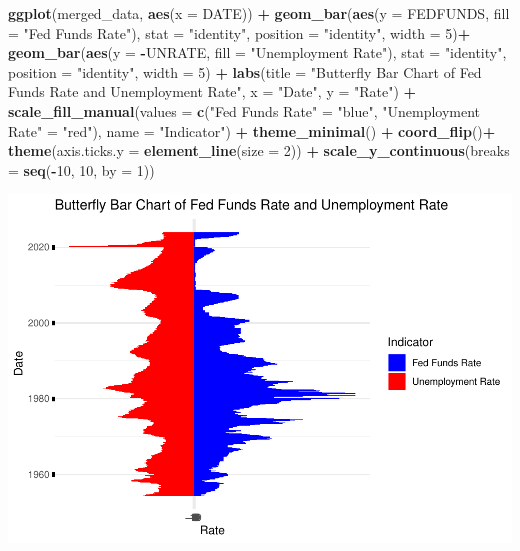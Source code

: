\documentclass[
]{article}
\newenvironment{Shaded}{\begin{snugshade}}{\end{snugshade}}
\newcommand{\AttributeTok}[1]{\textcolor[rgb]{0.13,0.29,0.53}{#1}}
\newcommand{\DecValTok}[1]{\textcolor[rgb]{0.00,0.00,0.81}{#1}}
\newcommand{\FunctionTok}[1]{\textcolor[rgb]{0.13,0.29,0.53}{\textbf{#1}}}
\newcommand{\NormalTok}[1]{#1}
\newcommand{\OtherTok}[1]{\textcolor[rgb]{0.56,0.35,0.01}{#1}}
\newcommand{\SpecialCharTok}[1]{\textcolor[rgb]{0.81,0.36,0.00}{\textbf{#1}}}
\newcommand{\StringTok}[1]{\textcolor[rgb]{0.31,0.60,0.02}{#1}}
\begin{document}
\begin{Shaded}
\begin{Highlighting}[]
\FunctionTok{ggplot}\NormalTok{(merged\_data, }\FunctionTok{aes}\NormalTok{(}\AttributeTok{x =}\NormalTok{ DATE)) }\SpecialCharTok{+}
  \FunctionTok{geom\_bar}\NormalTok{(}\FunctionTok{aes}\NormalTok{(}\AttributeTok{y =}\NormalTok{ FEDFUNDS, }\AttributeTok{fill =} \StringTok{"Fed Funds Rate"}\NormalTok{), }\AttributeTok{stat =} \StringTok{"identity"}\NormalTok{, }\AttributeTok{position =} \StringTok{"identity"}\NormalTok{, }\AttributeTok{width =} \DecValTok{5}\NormalTok{)}\SpecialCharTok{+}
  \FunctionTok{geom\_bar}\NormalTok{(}\FunctionTok{aes}\NormalTok{(}\AttributeTok{y =} \SpecialCharTok{{-}}\NormalTok{UNRATE, }\AttributeTok{fill =} \StringTok{"Unemployment Rate"}\NormalTok{), }\AttributeTok{stat =} \StringTok{"identity"}\NormalTok{, }\AttributeTok{position =} \StringTok{"identity"}\NormalTok{, }\AttributeTok{width =} \DecValTok{5}\NormalTok{) }\SpecialCharTok{+}
  \FunctionTok{labs}\NormalTok{(}\AttributeTok{title =} \StringTok{"Butterfly Bar Chart of Fed Funds Rate and Unemployment Rate"}\NormalTok{,}
       \AttributeTok{x =} \StringTok{"Date"}\NormalTok{,}
       \AttributeTok{y =} \StringTok{"Rate"}\NormalTok{) }\SpecialCharTok{+}
  \FunctionTok{scale\_fill\_manual}\NormalTok{(}\AttributeTok{values =} \FunctionTok{c}\NormalTok{(}\StringTok{"Fed Funds Rate"} \OtherTok{=} \StringTok{"blue"}\NormalTok{, }\StringTok{"Unemployment Rate"} \OtherTok{=} \StringTok{"red"}\NormalTok{),}
                    \AttributeTok{name =} \StringTok{"Indicator"}\NormalTok{) }\SpecialCharTok{+}
  \FunctionTok{theme\_minimal}\NormalTok{() }\SpecialCharTok{+}
  \FunctionTok{coord\_flip}\NormalTok{()}\SpecialCharTok{+}
  \FunctionTok{theme}\NormalTok{(}\AttributeTok{axis.ticks.y =} \FunctionTok{element\_line}\NormalTok{(}\AttributeTok{size =} \DecValTok{2}\NormalTok{)) }\SpecialCharTok{+}
  \FunctionTok{scale\_y\_continuous}\NormalTok{(}\AttributeTok{breaks =} \FunctionTok{seq}\NormalTok{(}\SpecialCharTok{{-}}\DecValTok{10}\NormalTok{, }\DecValTok{10}\NormalTok{, }\AttributeTok{by =} \DecValTok{1}\NormalTok{))}
\end{Highlighting}
\end{Shaded}

\includegraphics{Story_2_Joe_Garcia_files/figure-latex/unnamed-chunk-7-1.pdf}
\end{document}
